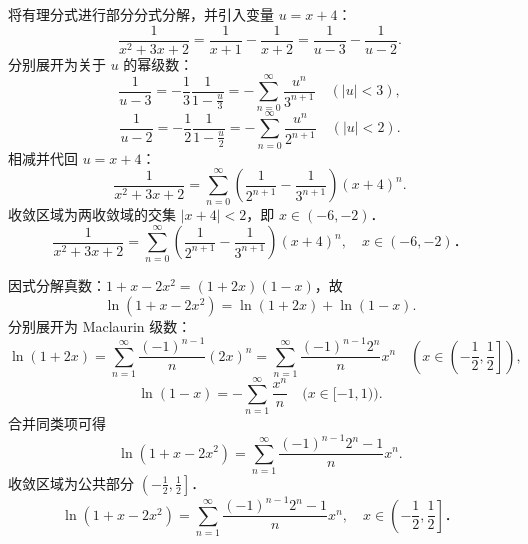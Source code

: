 \begin{solution}
    将有理分式进行部分分式分解，并引入变量 $u = x + 4$：
    \begin{equation}
        \frac{1}{x^2 + 3x + 2} = \frac{1}{x + 1} - \frac{1}{x + 2} = \frac{1}{u - 3} - \frac{1}{u - 2}.
    \end{equation}
    分别展开为关于 $u$ 的幂级数：
    \begin{equation}
        \frac{1}{u - 3} = -\frac{1}{3}\frac{1}{1 - \frac{u}{3}} = -\sum_{n=0}^\infty \frac{u^n}{3^{n+1}} \quad (|u| < 3),
    \end{equation}
    \begin{equation}
        \frac{1}{u - 2} = -\frac{1}{2}\frac{1}{1 - \frac{u}{2}} = -\sum_{n=0}^\infty \frac{u^n}{2^{n+1}} \quad (|u| < 2).
    \end{equation}
    相减并代回 $u = x + 4$：
    \begin{equation}
        \frac{1}{x^2 + 3x + 2} = \sum_{n=0}^\infty \left( \frac{1}{2^{n+1}} - \frac{1}{3^{n+1}} \right) (x + 4)^n.
    \end{equation}
    收敛区域为两收敛域的交集 $|x + 4| < 2$，即 $x \in (-6, -2)$．
    \begin{equation}
        \boxed{\frac{1}{x^2 + 3x + 2} = \sum_{n=0}^\infty \left( \frac{1}{2^{n+1}} - \frac{1}{3^{n+1}} \right) (x + 4)^n, \quad x \in (-6, -2)．}
    \end{equation}


    因式分解真数：$1 + x - 2x^2 = (1 + 2x)(1 - x)$，故
    \begin{equation}
        \ln(1 + x - 2x^2) = \ln(1 + 2x) + \ln(1 - x).
    \end{equation}
    分别展开为 Maclaurin 级数：
    \begin{equation}
        \ln(1 + 2x) = \sum_{n=1}^\infty \frac{(-1)^{n-1}}{n} (2x)^n = \sum_{n=1}^\infty \frac{(-1)^{n-1} 2^n}{n} x^n \quad \left( x \in \left(-\frac{1}{2}, \frac{1}{2}\right] \right),
    \end{equation}
    \begin{equation}
        \ln(1 - x) = -\sum_{n=1}^\infty \frac{x^n}{n} \quad \bigl( x \in [-1, 1) \bigr).
    \end{equation}
    合并同类项可得
    \begin{equation}
        \ln(1 + x - 2x^2) = \sum_{n=1}^\infty \frac{(-1)^{n-1} 2^n - 1}{n} x^n.
    \end{equation}
    收敛区域为公共部分 $\left(-\frac{1}{2}, \frac{1}{2}\right]$．
    \begin{equation}
        \boxed{\ln(1 + x - 2x^2) = \sum_{n=1}^\infty \frac{(-1)^{n-1} 2^n - 1}{n} x^n, \quad x \in \left(-\frac{1}{2}, \frac{1}{2}\right]．}
    \end{equation}


\end{solution}
